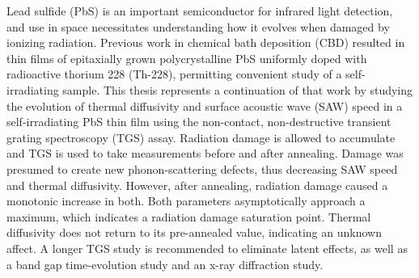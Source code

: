 % 
% 
%
Lead sulfide (PbS) is an important semiconductor for infrared light detection, and use in space necessitates understanding how it evolves when damaged by ionizing radiation. Previous work in chemical bath deposition (CBD) resulted in thin films of epitaxially grown polycrystalline PbS uniformly doped with radioactive thorium 228 (Th-228), permitting convenient study of a self-irradiating sample. This thesis represents a continuation of that work by studying the evolution of thermal diffusivity and surface acoustic wave (SAW) speed in a self-irradiating PbS thin film using the non-contact, non-destructive transient grating spectroscopy (TGS) assay. Radiation damage is allowed to accumulate and TGS is used to take measurements before and after annealing. Damage was presumed to create new phonon-scattering defects, thus decreasing SAW speed and thermal diffusivity. However, after annealing, radiation damage caused a monotonic increase in both. Both parameters asymptotically approach a maximum, which indicates a radiation damage saturation point. Thermal diffusivity does not return to its pre-annealed value, indicating an unknown affect. A longer TGS study is recommended to eliminate latent effects, as well as a band gap time-evolution study and an x-ray diffraction study.
